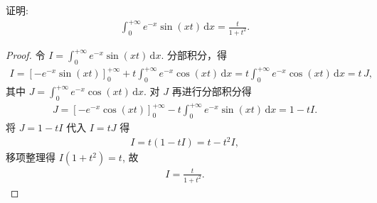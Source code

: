 \documentclass[../../main.tex]{subfiles}%
\begin{document}
\begin{proposition}\label{proposition:常见积分结论111}
证明:
\begin{align*}
\displaystyle\int_0^{+\infty} e^{-x}\sin(xt)\,\mathrm{d}x = \frac{t}{1+t^2}.
\end{align*}
\end{proposition}
\begin{proof}
令 $I = \int_0^{+\infty} e^{-x}\sin(xt)\,\mathrm{d}x$.
分部积分，得
\begin{align*}
I = \left[ -e^{-x}\sin(xt) \right]_0^{+\infty} + t\int_0^{+\infty} e^{-x}\cos(xt)\,\mathrm{d}x = t\int_0^{+\infty} e^{-x}\cos(xt)\,\mathrm{d}x = t\,J,
\end{align*}
其中 $J = \int_0^{+\infty} e^{-x}\cos(xt)\,\mathrm{d}x$.
对 $J$ 再进行分部积分得
\begin{align*}
J = \left[ -e^{-x}\cos(xt) \right]_0^{+\infty} - t\int_0^{+\infty} e^{-x}\sin(xt)\,\mathrm{d}x = 1 - t I.
\end{align*}
将 $J = 1 - t I$ 代入 $I = t J$ 得
\begin{align*}
I = t(1 - t I) = t - t^2 I,
\end{align*}
移项整理得 $I(1 + t^2) = t$, 故
\begin{align*}
I = \frac{t}{1+t^2}.
\end{align*}
\end{proof}
\end{document}
